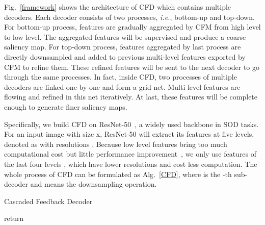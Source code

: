 \documentclass[letterpaper]{article} \usepackage{aaai20}  \usepackage{times}  \usepackage{helvet} \usepackage{courier}  \usepackage[hyphens]{url}  \usepackage{graphicx} \urlstyle{rm} \def\UrlFont{\rm}  \usepackage{graphicx}  \frenchspacing  \setlength{\pdfpagewidth}{8.5in}  \setlength{\pdfpageheight}{11in}
\begin{document}
Fig.~\ref{framework} shows the architecture of CFD which contains multiple decoders. Each decoder consists of two processes, {\it i.e.}, bottom-up and top-down. For bottom-up process, features are gradually aggregated by CFM from high level to low level. The aggregated features will be supervised and produce a coarse saliency map. For top-down process, features aggregated by last process are directly downsampled and added to previous multi-level features exported by CFM to refine them. These refined features will be sent to the next decoder to go through the same processes. In fact, inside CFD, two processes of multiple decoders are linked one-by-one and form a grid net. Multi-level features are flowing and refined in this net iteratively. At last, these features will be complete enough to generate finer saliency maps.

Specifically, we build CFD on ResNet-50~\cite{Resnet}, a widely used backbone in SOD tasks. For an input image with size x, ResNet-50 will extract its features at five levels, denoted as  with resolutions . Because low level features bring too much computational cost but little performance improvement~\cite{CPD}, we only use features of the last four levels , which have lower resolutions and cost less computation. The whole process of CFD can be formulated as Alg.~\ref{CFD}, where  is the -th sub-decoder and  means the downsampling operation.

\begin{algorithm}[htb]
  \caption{Cascaded Feedback Decoder}
  \label{CFD}
  \small \;
  \small \;
  \For{} {
    \small \;
    \small \;
    \small \;
  }
  return \;
\end{algorithm}
\end{document}
